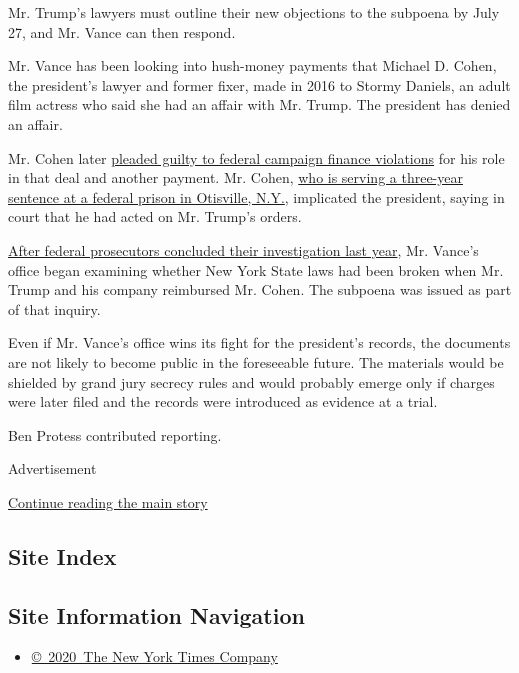 Mr. Trump's lawyers must outline their new objections to the subpoena by
July 27, and Mr. Vance can then respond.

Mr. Vance has been looking into hush-money payments that Michael D.
Cohen, the president's lawyer and former fixer, made in 2016 to Stormy
Daniels, an adult film actress who said she had an affair with Mr.
Trump. The president has denied an affair.

Mr. Cohen later
\href{https://www.nytimes.com/2018/11/29/nyregion/michael-cohen-trump-russia-mueller.html}{pleaded
guilty to federal campaign finance violations} for his role in that deal
and another payment. Mr. Cohen,
\href{https://www.nytimes.com/2018/12/12/nyregion/michael-cohen-sentence-trump.html}{who
is serving a three-year sentence at a federal prison in Otisville,
N.Y.}, implicated the president, saying in court that he had acted on
Mr. Trump's orders.

\href{https://www.nytimes.com/2019/07/17/nyregion/michael-cohen-trump-investigation.html}{After
federal prosecutors concluded their investigation last year}, Mr.
Vance's office began examining whether New York State laws had been
broken when Mr. Trump and his company reimbursed Mr. Cohen. The subpoena
was issued as part of that inquiry.

Even if Mr. Vance's office wins its fight for the president's records,
the documents are not likely to become public in the foreseeable future.
The materials would be shielded by grand jury secrecy rules and would
probably emerge only if charges were later filed and the records were
introduced as evidence at a trial.

Ben Protess contributed reporting.

Advertisement

\protect\hyperlink{after-bottom}{Continue reading the main story}

\hypertarget{site-index}{%
\subsection{Site Index}\label{site-index}}

\hypertarget{site-information-navigation}{%
\subsection{Site Information
Navigation}\label{site-information-navigation}}

\begin{itemize}
\tightlist
\item
  \href{https://help.nytimes.com/hc/en-us/articles/115014792127-Copyright-notice}{©~2020~The
  New York Times Company}
\end{itemize}

